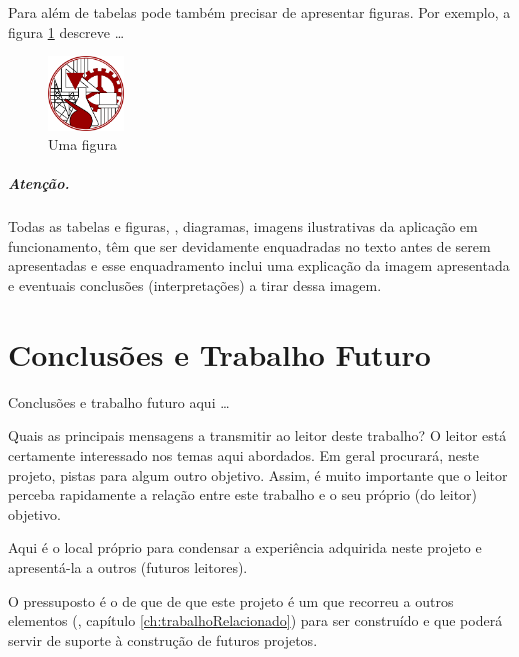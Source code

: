 Para além de tabelas pode também precisar de apresentar figuras. Por exemplo, a figura \ref{fig:umafigura} descreve \ldots
\begin{figure}[H][h]
   \centering
   \includegraphics[width=2cm]{./fig_logo_ISEL}
\caption{Uma figura}
\label{fig:umafigura}
\end{figure}
\noindent

\paragraph{Atenção.} Todas as tabelas e figuras, \eg, diagramas, imagens ilustrativas da aplicação em funcionamento, têm que ser devidamente enquadradas no texto antes de serem apresentadas e esse enquadramento inclui uma explicação da imagem apresentada e eventuais conclusões (interpretações) a tirar dessa imagem.


\chapter{Conclusões e Trabalho Futuro}
\label{ch:conclusoesTrabalhoFuturo}

Conclusões e trabalho futuro aqui \ldots

Quais as principais mensagens a transmitir ao leitor deste trabalho? O leitor está certamente interessado nos temas aqui abordados. Em geral procurará, neste projeto, pistas para algum outro objetivo. Assim, é muito importante que o leitor perceba rapidamente a relação entre este trabalho e o seu próprio (do leitor) objetivo.

Aqui é o local próprio para condensar a experiência adquirida neste projeto e apresentá-la a outros (futuros leitores).

O pressuposto é o de que de que este projeto é um  que recorreu a outros elementos (\cf, capítulo \ref{ch:trabalhoRelacionado}) para ser construído e que poderá servir de suporte à construção de futuros projetos.








